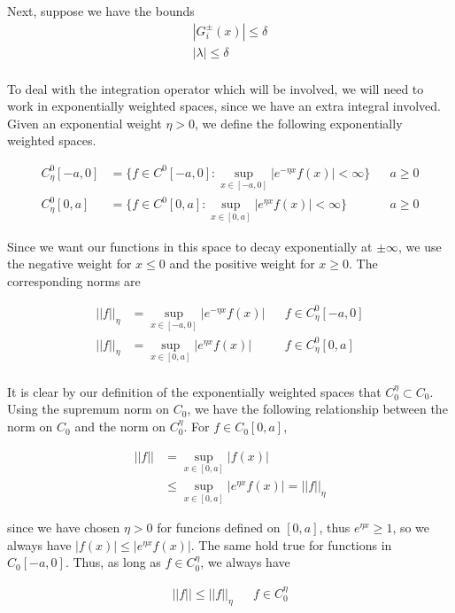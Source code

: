 \documentclass[12pt]{article}
\begin{document}
Next, suppose we have the bounds
\begin{align*}
|G_i^\pm(x)| \leq \delta \\
|\lambda| \leq \delta \\
\end{align*}

To deal with the integration operator which will be involved, we will need to work in exponentially weighted spaces, since we have an extra integral involved. Given an exponential weight $\eta > 0$, we define the following exponentially weighted spaces.

\begin{align*}
C^0_\eta[-a, 0] &= \{ f \in C^0[-a, 0] : \sup_{x \in [-a, 0]} |e^{-\eta x} f(x) | < \infty \} && a \geq 0 \\
C^0_\eta[0, a] &= \{ f \in C^0[0, a] : \sup_{x \in [0, a]} |e^{\eta x} f(x) | < \infty \} && a \geq 0 
\end{align*}

Since we want our functions in this space to decay exponentially at $\pm \infty$, we use the negative weight for $x \leq 0$ and the positive weight for $x \geq 0$. The corresponding norms are 

\begin{align*}
|| f ||_\eta &= \sup_{x \in [-a, 0]} |e^{-\eta x} f(x) | && f \in C^0_\eta[-a, 0] \\
|| f ||_\eta &= \sup_{x \in [0, a]} |e^{\eta x} f(x) | && f \in C^0_\eta[0, a] \\
\end{align*}

It is clear by our definition of the exponentially weighted spaces that $C_0^\eta \subset C_0$. Using the supremum norm on $C_0$, we have the following relationship between the norm on $C_0$ and the norm on $C_0^\eta$. For $f \in C_0[0, a]$,

\begin{align*}
|| f || &= \sup_{x \in [0,a]} | f(x) | \\
&\leq \sup_{x \in [0,a]} | e^{\eta x} f(x) | = ||f||_\eta
\end{align*}

since we have chosen $\eta > 0$ for funcions defined on $[0, a]$, thus $e^{\eta x} \geq 1$, so we always have $|f(x)| \leq  |e^{\eta x} f(x)|$. The same hold true for functions in $C_0[-a, 0]$. Thus, as long as $f \in C_0^\eta$, we always have

\begin{align*}
||f|| \leq ||f||_\eta && f \in C_0^\eta
\end{align*}
\end{document}
